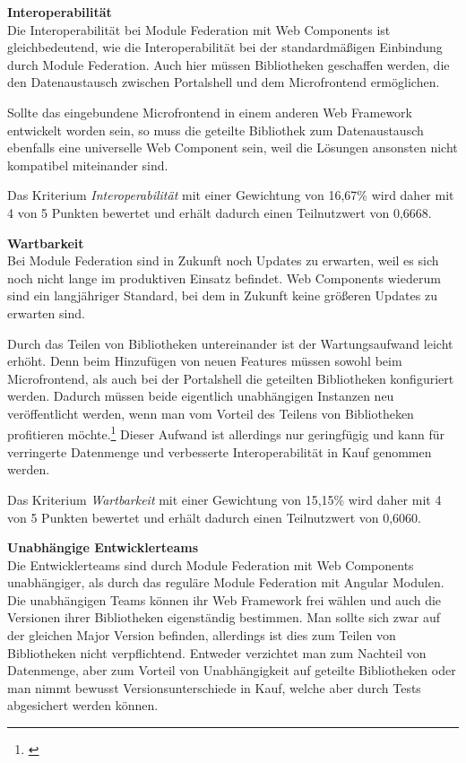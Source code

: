 \textbf{Interoperabilität}\\
Die Interoperabilität bei Module Federation mit Web Components ist gleichbedeutend, wie die Interoperabilität bei der standardmäßigen Einbindung durch Module Federation. Auch hier müssen Bibliotheken geschaffen werden, die den Datenaustausch zwischen Portalshell und dem Microfrontend ermöglichen.

Sollte das eingebundene Microfrontend in einem anderen Web Framework entwickelt worden sein, so muss die geteilte Bibliothek zum Datenaustausch ebenfalls eine universelle Web Component sein, weil die Lösungen ansonsten nicht kompatibel miteinander sind.

Das Kriterium \textit{Interoperabilität} mit einer Gewichtung von 16,67\% wird daher mit 4 von 5 Punkten bewertet und erhält dadurch einen Teilnutzwert von 0,6668.

\textbf{Wartbarkeit}\\
Bei Module Federation sind in Zukunft noch Updates zu erwarten, weil es sich noch nicht lange im produktiven Einsatz befindet. Web Components wiederum sind ein langjähriger Standard, bei dem in Zukunft keine größeren Updates zu erwarten sind.

Durch das Teilen von Bibliotheken untereinander ist der Wartungsaufwand leicht erhöht. Denn beim Hinzufügen von neuen Features müssen sowohl beim Microfrontend, als auch bei der Portalshell die geteilten Bibliotheken konfiguriert werden. Dadurch müssen beide eigentlich unabhängigen Instanzen neu veröffentlicht werden, wenn man vom Vorteil des Teilens von Bibliotheken profitieren möchte.\footnote{\cite[vgl.][]{Steyer2021a}} Dieser Aufwand ist allerdings nur geringfügig und kann für verringerte Datenmenge und verbesserte Interoperabilität in Kauf genommen werden.

Das Kriterium \textit{Wartbarkeit} mit einer Gewichtung von 15,15\% wird daher mit 4 von 5 Punkten bewertet und erhält dadurch einen Teilnutzwert von 0,6060.

\textbf{Unabhängige Entwicklerteams}\\
Die Entwicklerteams sind durch Module Federation mit Web Components unabhängiger, als durch das reguläre Module Federation mit Angular Modulen. Die unabhängigen Teams können ihr Web Framework frei wählen und auch die Versionen ihrer Bibliotheken eigenständig bestimmen. Man sollte sich zwar auf der gleichen Major Version befinden, allerdings ist dies zum Teilen von Bibliotheken nicht verpflichtend. Entweder verzichtet man zum Nachteil von Datenmenge, aber zum Vorteil von Unabhängigkeit auf geteilte Bibliotheken oder man nimmt bewusst Versionsunterschiede in Kauf, welche aber durch Tests abgesichert werden können.

